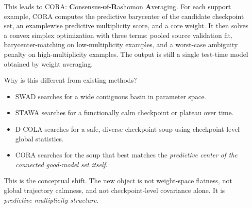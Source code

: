 \documentclass{article}
\newcommand{\cora}{\textup{\textsc{CORA}}}
\newcommand{\swad}{\textup{\textsc{SWAD}}}
\newcommand{\stawa}{\textup{\textsc{STAWA}}}
\newcommand{\dcola}{\textup{\textsc{D-COLA}}}
\begin{document}
This leads to \cora{}: \textbf{C}onsensus-\textbf{o}f-\textbf{R}ashomon \textbf{A}veraging. For each support example, \cora{} computes the predictive barycenter of the candidate checkpoint set, an examplewise predictive multiplicity score, and a core weight. It then solves a convex simplex optimization with three terms: pooled source validation fit, barycenter-matching on low-multiplicity examples, and a worst-case ambiguity penalty on high-multiplicity examples. The output is still a single test-time model obtained by weight averaging.

Why is this different from existing methods?
\begin{itemize}[leftmargin=1.4em]
    \item \swad{} searches for a wide contiguous basin in parameter space.
    \item \stawa{} searches for a functionally calm checkpoint or plateau over time.
    \item \dcola{} searches for a safe, diverse checkpoint soup using checkpoint-level global statistics.
    \item \cora{} searches for the soup that best matches the \emph{predictive center of the connected good-model set itself}.
\end{itemize}

This is the conceptual shift. The new object is not weight-space flatness, not global trajectory calmness, and not checkpoint-level covariance alone. It is \emph{predictive multiplicity structure}.
\end{document}
